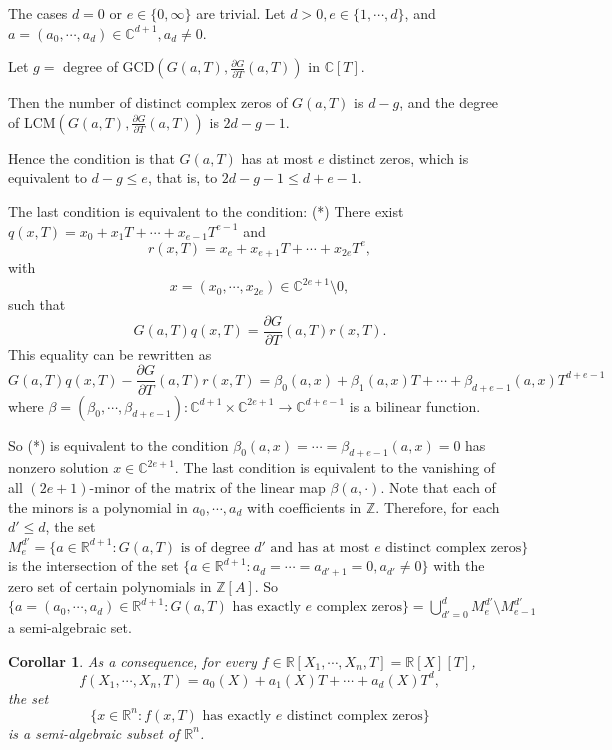\documentclass[12pt]{article}
\theoremstyle{mythm}
\let\oldendproof\endproof
\renewenvironment{proof}[1][\proofname]{%
  \oldproof[\normalfont \bfseries \sffamily #1]%
}{\oldendproof}
\renewcommand*{\proofname}{Proof}
\renewcommand*{\proofname}{Proof}
\newtheorem{cor}{Corollar}[section]
\renewcommand*{\proofname}{Proof}
\renewcommand*{\proofname}{Proof}
\renewcommand*{\proofname}{Proof}
\renewcommand*{\proofname}{Proof}
\renewcommand*{\proofname}{Proof}
\newcommand{\CC}{\mathbb{C}}
\newcommand{\RR}{\mathbb{R}}
\newcommand{\ZZ}{\mathbb{Z}}
\begin{document}
\begin{proof}
The cases \( d = 0 \) or \( e \in \{0, \infty\} \) are trivial.  
Let \( d > 0, e \in \{1, \cdots, d\} \), and \( a = (a_0, \cdots, a_d) \in \CC^{d+1}, a_d \neq 0 \).  

Let \( g = \) degree of GCD\((G(a, T), \frac{\partial G}{\partial T}(a, T))\) in \(\CC[T]\).  

Then the number of distinct complex zeros of \( G(a, T) \) is \( d - g \), and the degree of LCM\((G(a, T), \frac{\partial G}{\partial T}(a, T))\) is \( 2d - g - 1 \).  

Hence the condition is that \( G(a, T) \) has at most \( e \) distinct zeros, which is equivalent to \( d - g \leq e \), that is, to \( 2d - g - 1 \leq d + e - 1 \).  

The last condition is equivalent to the condition:  
(*) There exist \( q(x, T) = x_0 + x_1 T + \cdots + x_{e-1} T^{e-1} \) and  
\[r(x, T) = x_e + x_{e+1} T + \cdots + x_{2e} T^e,\]  
with  
\[x = (x_0, \cdots, x_{2e}) \in \CC^{2e+1} \setminus 0,\]  
such that  
\[G(a, T)q(x, T) = \frac{\partial G}{\partial T}(a, T) r(x, T).\]  
This equality can be rewritten as  
\[G(a, T)q(x, T) - \frac{\partial G}{\partial T}(a, T) r(x, T) = \beta_0(a, x) + \beta_1(a, x) T + \cdots + \beta_{d+e-1}(a, x) T^{d+e-1}\]  
where \( \beta = (\beta_0, \cdots, \beta_{d+e-1}) : \CC^{d+1} \times \CC^{2e+1} \to \CC^{d+e-1} \) is a bilinear function.

So (*) is equivalent to the condition \(\beta_0(a, x) = \cdots = \beta_{d+e-1}(a, x) = 0\) has nonzero solution \(x \in \CC^{2e+1}\).  
The last condition is equivalent to the vanishing of all \((2e+1)\)-minor of the matrix of the linear map \(\beta(a, \cdot)\).  
Note that each of the minors is a polynomial in \(a_0, \cdots, a_d\) with coefficients in \(\ZZ\).  
Therefore, for each \(d' \leq d\), the set \(M_e^{d'} = \{a \in \RR^{d+1}: G(a, T) \text{ is of degree } d' \text{ and has at most } e \text{ distinct complex zeros}\}\) is the intersection of the set \(\{a \in \RR^{d+1}: a_d = \cdots = a_{d'+1} = 0, a_{d'} \neq 0\}\) with the zero set of certain polynomials in \(\ZZ[A]\).  
So \(\{a = (a_0, \cdots, a_d) \in \RR^{d+1}: G(a, T) \text{ has exactly } e \text{ complex zeros}\} = \bigcup_{d'=0}^d M_e^{d'} \setminus M_{e-1}^{d'} \) a semi-algebraic set.
\end{proof}

\begin{cor}
As a consequence, for every \( f \in \RR[X_1, \cdots, X_n, T] = \RR[X][T] \),
\[f(X_1, \cdots, X_n, T) = a_0(X) + a_1(X)T + \cdots + a_d(X)T^d,\]
the set
\[
\{x \in \RR^n : f(x, T) \text{ has exactly } e \text{ distinct complex zeros}\}
\]
is a semi-algebraic subset of \(\RR^n\).
\end{cor}
\end{document}
